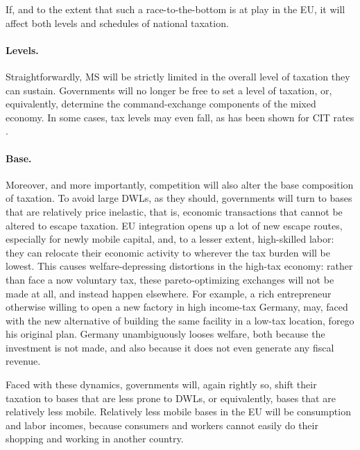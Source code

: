 \documentclass[11pt,a4paper,oneside]{article}
\begin{document}


If, and to the extent that such a race-to-the-bottom is at play in the \gls{EU}, it will affect both levels and schedules of national taxation.

\paragraph{Levels.}
Straightforwardly, \gls{MS} will be strictly limited in the overall level of taxation they can sustain.
Governments will no longer be free to set a level of taxation, or, equivalently, determine the command-exchange components of the mixed economy.
In some cases, tax levels may even fall, as has been shown for \gls{CIT} rates \citep{Piatkowski2008}.


\paragraph{Base.}
Moreover, and more importantly, competition will also alter the base composition of taxation.
To avoid large \glspl{DWL}, as they should, governments will turn to bases that are relatively price inelastic, that is, economic transactions that cannot be altered to escape taxation.
\gls{EU} integration opens up a lot of new escape routes, especially for newly mobile capital, and, to a lesser extent, high-skilled labor:
they can relocate their economic activity to wherever the tax burden will be lowest.
This causes welfare-depressing distortions in the high-tax economy:
rather than face a now voluntary tax, these pareto-optimizing exchanges will not be made at all, and instead happen elsewhere.
For example, a rich entrepreneur otherwise willing to open a new factory in high income-tax Germany, may, faced with the new alternative of building the same facility in a low-tax location, forego his original plan.
Germany unambiguously looses welfare, both because the investment is not made, and also because it does not even generate any fiscal revenue.

Faced with these dynamics, governments will, again rightly so, shift their taxation to bases that are less prone to \glspl{DWL}, or equivalently, bases that are relatively less mobile.
Relatively less mobile bases in the \gls{EU} will be consumption and labor incomes, because consumers and workers cannot easily do their shopping and working in another country.
\end{document}
